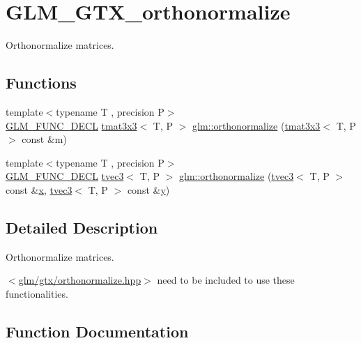 \hypertarget{group__gtx__orthonormalize}{}\section{G\+L\+M\+\_\+\+G\+T\+X\+\_\+orthonormalize}
\label{group__gtx__orthonormalize}


Orthonormalize matrices.  


\subsection*{Functions}
\begin{DoxyCompactItemize}
\item 
{\footnotesize template$<$typename T , precision P$>$ }\\\mbox{\hyperlink{setup_8hpp_ab2d052de21a70539923e9bcbf6e83a51}{G\+L\+M\+\_\+\+F\+U\+N\+C\+\_\+\+D\+E\+CL}} \mbox{\hyperlink{structglm_1_1tmat3x3}{tmat3x3}}$<$ T, P $>$ \mbox{\hyperlink{group__gtx__orthonormalize_ga23c4340b8f1559d259229b6d8bdc3f97}{glm\+::orthonormalize}} (\mbox{\hyperlink{structglm_1_1tmat3x3}{tmat3x3}}$<$ T, P $>$ const \&m)
\item 
{\footnotesize template$<$typename T , precision P$>$ }\\\mbox{\hyperlink{setup_8hpp_ab2d052de21a70539923e9bcbf6e83a51}{G\+L\+M\+\_\+\+F\+U\+N\+C\+\_\+\+D\+E\+CL}} \mbox{\hyperlink{structglm_1_1tvec3}{tvec3}}$<$ T, P $>$ \mbox{\hyperlink{group__gtx__orthonormalize_gad7afff30d7323fdc7aed7f5a16a0c596}{glm\+::orthonormalize}} (\mbox{\hyperlink{structglm_1_1tvec3}{tvec3}}$<$ T, P $>$ const \&\mbox{\hyperlink{glad_8h_a92d0386e5c19fb81ea88c9f99644ab1d}{x}}, \mbox{\hyperlink{structglm_1_1tvec3}{tvec3}}$<$ T, P $>$ const \&\mbox{\hyperlink{glad_8h_a66ddd433d2cacfe27f5906b7e86faeed}{y}})
\end{DoxyCompactItemize}


\subsection{Detailed Description}
Orthonormalize matrices. 

$<$\mbox{\hyperlink{orthonormalize_8hpp}{glm/gtx/orthonormalize.\+hpp}}$>$ need to be included to use these functionalities. 

\subsection{Function Documentation}
\mbox{\label{group__gtx__orthonormalize_ga23c4340b8f1559d259229b6d8bdc3f97}} 
